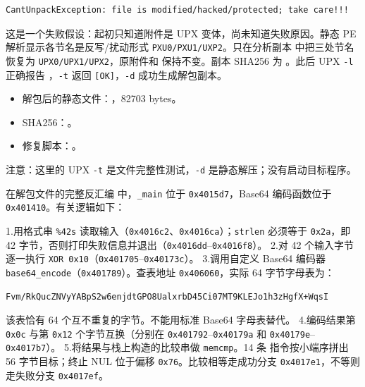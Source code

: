 \begin{verbatim}
CantUnpackException: file is modified/hacked/protected; take care!!!
\end{verbatim}

这是一个失败假设：起初只知道附件是 UPX 变体，尚未知道失败原因。静态 PE 解析显示各节名是反写/扰动形式 \texttt{PXU0/PXU1/UXP2}。只在分析副本 \texttt{} 中把三处节名恢复为 \texttt{UPX0/UPX1/UPX2}，原附件和 \texttt{} 保持不变。副本 SHA256 为 \texttt{}。此后 UPX \texttt{-l} 正确报告 \texttt{}，\texttt{-t} 返回 \texttt{{[}OK{]}}，\texttt{-d} 成功生成解包副本。

\begin{itemize}
\tightlist
\item
  解包后的静态文件：\texttt{}，82703 bytes。
\item
  SHA256：\texttt{}。
\item
  修复脚本：\texttt{}。
\end{itemize}

注意：这里的 UPX \texttt{-t} 是文件完整性测试，\texttt{-d} 是静态解压；没有启动目标程序。

在解包文件的完整反汇编 \texttt{} 中，\texttt{\_main} 位于 \texttt{0x4015d7}，Base64 编码函数位于 \texttt{0x401410}。有关逻辑如下：

1.用格式串 \texttt{\%42s} 读取输入（\texttt{0x4016c2}、\texttt{0x4016ca}）；\texttt{strlen} 必须等于 \texttt{0x2a}，即 42 字节，否则打印失败信息并退出（\texttt{0x4016dd}--\texttt{0x4016f8}）。 2.对 42 个输入字节逐一执行 \texttt{XOR\ 0x10}（\texttt{0x401705}--\texttt{0x40173c}）。 3.调用自定义 Base64 编码器 \texttt{base64\_encode}（\texttt{0x401789}）。查表地址 \texttt{0x406060}，实际 64 字节字母表为：

\begin{verbatim}
Fvm/RkQucZNVyYABpS2w6enjdtGPO8UalxrbD45Ci07MT9KLEJo1h3zHgfX+WqsI
\end{verbatim}

该表恰有 64 个互不重复的字节。不能用标准 Base64 字母表替代。 4.编码结果第 \texttt{0x0c} 与第 \texttt{0x12} 个字节互换（分别在 \texttt{0x401792}--\texttt{0x40179a} 和 \texttt{0x40179e}--\texttt{0x4017b7}）。 5.将结果与栈上构造的比较串做 \texttt{memcmp}。14 条 \texttt{} 指令按小端序拼出 56 字节目标；终止 NUL 位于偏移 \texttt{0x76}。比较相等走成功分支 \texttt{0x4017e1}，不等则走失败分支 \texttt{0x4017ef}。

